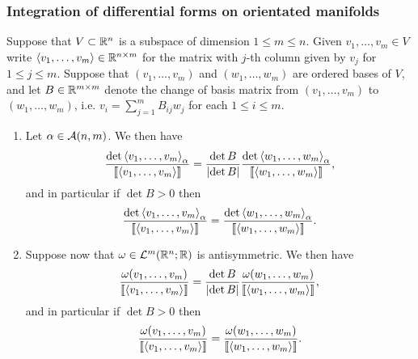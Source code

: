\documentclass[a4paper]{article}
\begin{document}
\subsubsection{Integration of differential forms on 
orientated manifolds}

\begin{lemma}
  Suppose that $V \subset \mathbb{R}^n$ is a subspace of dimension
  $1\leq m \leq n$. Given $v_1,\dots,v_m \in V$ write
  $\left\langle v_1,\dots,v_m \right\rangle \in \mathbb{R}^{n \times m}$ for the matrix
  with $j$-th column given by $v_j$ for $1 \leq j \leq m$.
  Suppose that $(v_1,\dots,v_m)$ and $(w_1,\dots,w_m)$ are
  ordered bases of $V$, and let $B \in \mathbb{R}^{m \times m}$ denote
  the change of basis matrix from $(v_1,\dots,v_m)$ to
  $(w_1,\dots,w_m)$, i.e. $v_i = \sum_{j=1}^m B_{ij} w_j$
  for each $1 \leq i \leq m$.
  
  
  
  \begin{enumerate}
  \item Let $\alpha \in \mathcal{A}(n,m)$. We then have 
  \[
  \frac{\det \left\langle v_1,\dots,v_m \right\rangle_\alpha }
  {\left\llbracket \left\langle v_1,\dots,v_m \right\rangle \right\rrbracket }
  = \frac{\det B}{\left\lvert \det B\right\rvert}
  \frac{\det \left\langle w_1,\dots,w_m \right\rangle_\alpha }
  {\left\llbracket \left\langle w_1,\dots,w_m \right\rangle \right\rrbracket },
  \]
  and in particular if $\det B >0$ then
  \[
  \frac{\det \left\langle v_1,\dots,v_m \right\rangle_\alpha }
  {\left\llbracket \left\langle v_1,\dots,v_m \right\rangle \right\rrbracket }
  = \frac{\det \left\langle w_1,\dots,w_m \right\rangle_\alpha }
  {\left\llbracket \left\langle w_1,\dots,w_m \right\rangle \right\rrbracket }.
  \]
  
  
  \item Suppose now that $\omega \in \mathcal{L}^m(\mathbb{R}^n;\mathbb{R})$ is
  antisymmetric. We then have
  \[
  \frac{\omega(v_1,\dots,v_m)}{\left\llbracket \left\langle v_1,\dots,v_m \right\rangle \right\rrbracket }
  = \frac{\det B}{\left\lvert \det B\right\rvert} \frac{\omega(w_1,\dots,w_m)}
  {\left\llbracket \left\langle w_1,\dots,w_m \right\rangle \right\rrbracket},
  \]
  and in particular if $\det B > 0$ then
  \[
  \frac{\omega(v_1,\dots,v_m)}{\left\llbracket \left\langle v_1,\dots,v_m \right\rangle \right\rrbracket}
  = \frac{\omega(w_1,\dots,w_m)}{\left\llbracket \left\langle w_1,\dots,w_m \right\rangle \right\rrbracket}.
  \]
  \end{enumerate}
\end{lemma}
\end{document}
